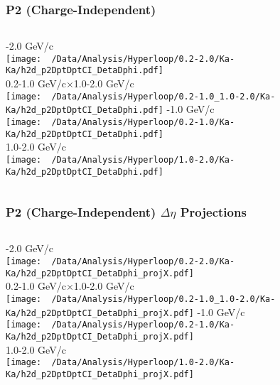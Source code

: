 \documentclass{beamer}
\begin{document}
\begin{frame}
	\frametitle{P2 (Charge-Independent)}
	\begin{columns}
		-2.0 GeV/c\\
		\texttt{[image: ~/Data/Analysis/Hyperloop/0.2-2.0/Ka-Ka/h2d\_p2DptDptCI\_DetaDphi.pdf]}\\0.2-1.0 GeV/c$\times$1.0-2.0 GeV/c\\
		\texttt{[image: ~/Data/Analysis/Hyperloop/0.2-1.0\_1.0-2.0/Ka-Ka/h2d\_p2DptDptCI\_DetaDphi.pdf]}
		-1.0 GeV/c\\
		\texttt{[image: ~/Data/Analysis/Hyperloop/0.2-1.0/Ka-Ka/h2d\_p2DptDptCI\_DetaDphi.pdf]}\\1.0-2.0 GeV/c\\
		\texttt{[image: ~/Data/Analysis/Hyperloop/1.0-2.0/Ka-Ka/h2d\_p2DptDptCI\_DetaDphi.pdf]}
	\end{columns}
\end{frame}
\begin{frame}
	\frametitle{P2 (Charge-Independent) $\Delta\eta$ Projections}
	\begin{columns}
		\column{0.5\textwidth}
		-2.0 GeV/c\\
		\texttt{[image: ~/Data/Analysis/Hyperloop/0.2-2.0/Ka-Ka/h2d\_p2DptDptCI\_DetaDphi\_projX.pdf]}\\0.2-1.0 GeV/c$\times$1.0-2.0 GeV/c\\
		\texttt{[image: ~/Data/Analysis/Hyperloop/0.2-1.0\_1.0-2.0/Ka-Ka/h2d\_p2DptDptCI\_DetaDphi\_projX.pdf]}
		\column{0.5\textwidth}
		-1.0 GeV/c\\
		\texttt{[image: ~/Data/Analysis/Hyperloop/0.2-1.0/Ka-Ka/h2d\_p2DptDptCI\_DetaDphi\_projX.pdf]}\\1.0-2.0 GeV/c\\
		\texttt{[image: ~/Data/Analysis/Hyperloop/1.0-2.0/Ka-Ka/h2d\_p2DptDptCI\_DetaDphi\_projX.pdf]}
	\end{columns}
\end{frame}
\end{document}
